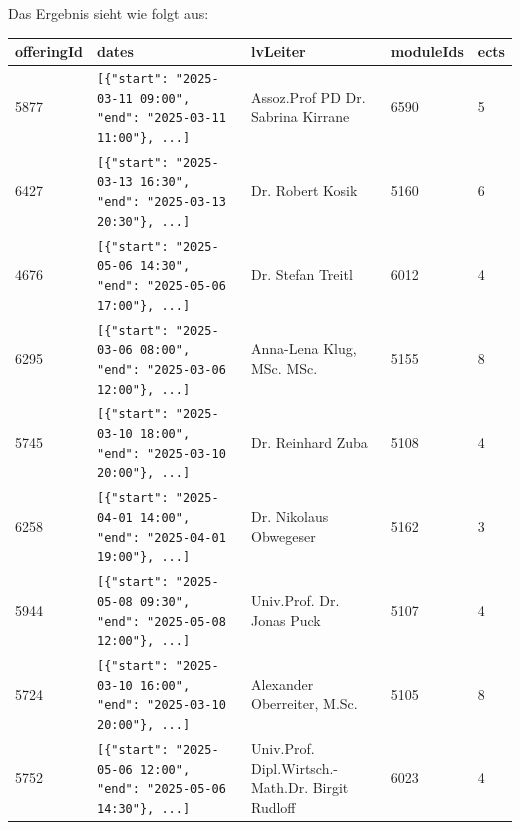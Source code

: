 Das Ergebnis sieht wie folgt aus:

\clearpage

\begin{table}
    {\fontsize{8}{10}\selectfont
        \begin{tabular}{lllll}
            \toprule
            \textbf{offeringId} & \textbf{dates}                                                         & \textbf{lvLeiter}                                & \textbf{moduleIds} & \textbf{ects} \\
            \midrule
            5877                & \verb|[{"start": "2025-03-11 09:00", "end": "2025-03-11 11:00"}, ...]| & Assoz.Prof PD Dr. Sabrina Kirrane                & 6590               & 5             \\
            6427                & \verb|[{"start": "2025-03-13 16:30", "end": "2025-03-13 20:30"}, ...]| & Dr. Robert Kosik                                 & 5160               & 6             \\
            4676                & \verb|[{"start": "2025-05-06 14:30", "end": "2025-05-06 17:00"}, ...]| & Dr. Stefan Treitl                                & 6012               & 4             \\
            6295                & \verb|[{"start": "2025-03-06 08:00", "end": "2025-03-06 12:00"}, ...]| & Anna-Lena Klug, MSc. MSc.                        & 5155               & 8             \\
            5745                & \verb|[{"start": "2025-03-10 18:00", "end": "2025-03-10 20:00"}, ...]| & Dr. Reinhard Zuba                                & 5108               & 4             \\
            6258                & \verb|[{"start": "2025-04-01 14:00", "end": "2025-04-01 19:00"}, ...]| & Dr. Nikolaus Obwegeser                           & 5162               & 3             \\
            5944                & \verb|[{"start": "2025-05-08 09:30", "end": "2025-05-08 12:00"}, ...]| & Univ.Prof. Dr. Jonas Puck                        & 5107               & 4             \\
            5724                & \verb|[{"start": "2025-03-10 16:00", "end": "2025-03-10 20:00"}, ...]| & Alexander Oberreiter, M.Sc.                      & 5105               & 8             \\
            5752                & \verb|[{"start": "2025-05-06 12:00", "end": "2025-05-06 14:30"}, ...]| & Univ.Prof. Dipl.Wirtsch.-Math.Dr. Birgit Rudloff & 6023               & 4             \\

\end{tabular}}
\end{table}
